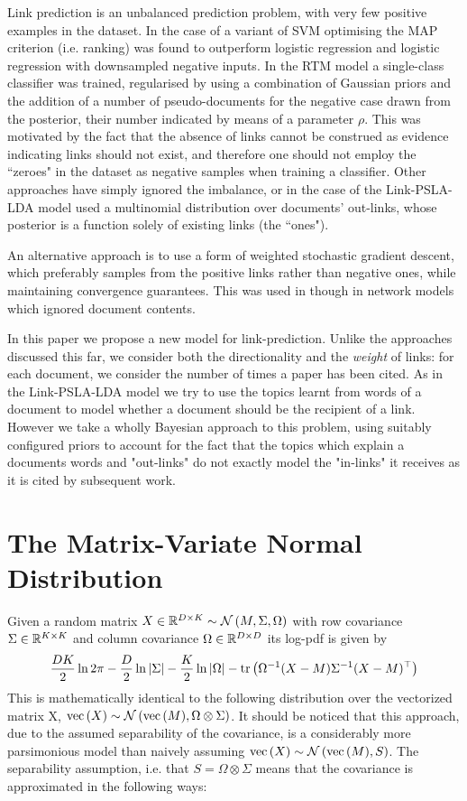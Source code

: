 Link prediction is an unbalanced prediction problem, with very few positive examples in the dataset. In the case of \cite{Bethard2010} a variant of SVM optimising the MAP criterion\cite{Yue2007} (i.e. ranking) was found to outperform logistic regression and logistic regression with downsampled negative inputs. In the RTM model\cite{Chang2009a}\cite{Chang2010a} a single-class classifier was trained, regularised by using a combination of Gaussian priors and the addition of a number of pseudo-documents for the negative case drawn from the posterior, their number indicated by means of a parameter $\rho$. This was motivated by the fact that the absence of links cannot be construed as evidence indicating links should not exist, and therefore one should not employ the ``zeroes" in the dataset as negative samples when training a classifier. Other approaches have simply ignored the imbalance, or in the case of the Link-PSLA-LDA model\cite{Nallapati2008}\cite{Nallapati2008a} used a multinomial distribution over documents' out-links, whose posterior is a function solely of existing links (the ``ones").

An alternative approach is to use a form of weighted stochastic gradient descent, which preferably samples from the positive links rather than negative ones, while maintaining convergence guarantees. This was used in \cite{Gopalan2013b}\cite{Gopalan2013} though in network models which ignored document contents.

In this paper we propose a new model for link-prediction. Unlike the approaches discussed this far, we consider both the directionality and the \emph{weight} of links: for each document, we consider the number of times a paper has been cited. As in the Link-PSLA-LDA model we try to use the topics learnt from words of a document to model whether a document should be the recipient of a link. However we take a wholly Bayesian approach to this problem, using suitably configured priors to account for the fact that the topics which explain a documents words and "out-links" do not exactly model the "in-links" it receives as it is cited by subsequent work.

\section{The Matrix-Variate Normal Distribution}
Given a random matrix $X \in { \mathbb{R}^{D \times K} } \sim \mathcal{N} \left(M, \Sigma, \Omega\right)$ with row covariance $\Sigma \in { \mathbb{R}^{K \times K} }$ and column covariance $\Omega \in { \mathbb{R}^{D \times D} }$ its log-pdf is given by
\begin{align}
\frac{DK}{2}\ln 2\pi - \frac{D}{2}\ln|\Sigma| - \frac{K}{2} \ln|\Omega| -\text{tr} \left( {{\Omega}^{-1}(X - M){\Sigma}^{-1}(X - M)^\top} \right)
\end{align}
This is mathematically identical to the following distribution over the vectorized matrix X, $\text{vec}\left(X\right) \sim \mathcal{N} \left( {\text{vec}\left(M\right)}, {\Omega \otimes \Sigma} \right)$. It should be noticed that this approach, due to the assumed separability of the covariance, is a considerably more parsimonious model than naively assuming $\text{vec}\left(X\right) \sim \mathcal{N} \left( {\text{vec}\left(M\right)}, {S} \right)$. The separability assumption, i.e. that $S = \Omega \otimes \Sigma$ means that the covariance is approximated in the following ways:

